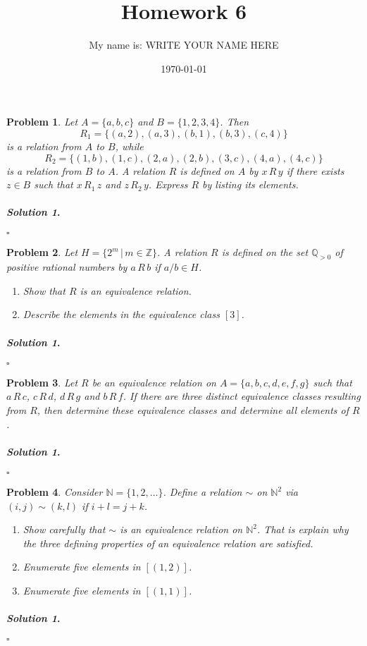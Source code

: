 \documentclass{amsart}
\theoremstyle{plain}
\newtheorem{problem}{Problem}
\newenvironment{solution}{\paragraph{\emph{Solution 1}.}}{\hfill$\square$}
\begin{document}
 

\title[Homework 6]{Homework 6}
\author{My name is:  WRITE YOUR NAME HERE}  %
\date{\today} 
\maketitle 

\begin{problem}
Let $A = \{a,b,c \}$ and $B = \{1,2,3,4 \}$.  Then
$$R_{1} = \{(a,2),(a,3),(b,1),(b,3),(c,4) \} $$
is a relation from $A$ to $B$, while
$$R_{2} = \{(1,b),(1,c),(2,a),(2,b),(3,c),(4,a),(4,c) \} $$
is a relation from $B$ to $A$.  A relation $R$ is defined on $A$ by $x\, R \,y$ if there exists $z \in B$ such that $x \, R_{1} \, z$ and $z \, R_{2} \, y $.  Express $R$ by listing its elements.
\end{problem}
\begin{solution}
\end{solution}

\begin{problem}
Let $H = \{2^{m}\, | \, m \in \mathbb{Z} \}$.  A relation $R$ is defined on the set $\mathbb{Q}_{>0}$ of positive rational numbers by $a \, R \, b$ if $a/b \in H$.
\begin{enumerate}
\item Show that $R$ is an equivalence relation.
\item Describe the elements in the equivalence class $[3]$.
\end{enumerate}
\end{problem}
\begin{solution}
\end{solution}

\begin{problem}
Let $R$ be an equivalence relation on $A = \{a,b,c,d,e,f,g \}$ such that $a \, R \, c$, $c \, R \, d$, $d \, R \, g$ and $b \, R \, f$.  If there are three distinct equivalence classes resulting from $R$, then determine these equivalence classes and determine all elements of $R$.
\end{problem}
\begin{solution}
\end{solution}


\begin{problem}
Consider $\mathbb{N} = \{1,2,\ldots \}$.  Define a relation $\sim$ on $\mathbb{N}^{2}$ via $(i,j) \sim (k,l)$ if $i+l = j + k$.   
\begin{enumerate}
\item Show carefully that $\sim$ is an equivalence relation on $\mathbb{N}^{2}$.  That is explain why the three defining properties of an equivalence relation are satisfied.
\item Enumerate five elements in $[(1,2)]$.
\item Enumerate five elements in $[(1,1)]$.
\end{enumerate}
\end{problem}
\begin{solution}
\end{solution}
\end{document}
